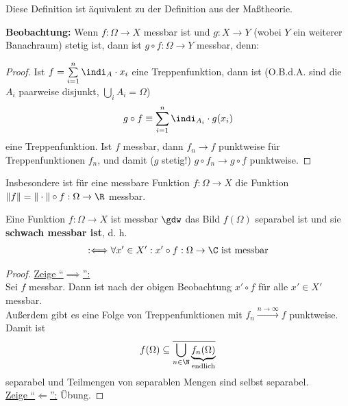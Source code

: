 \begin{bemerkung}
Diese Definition ist äquivalent zu der Definition aus der Maßtheorie.
\end{bemerkung}

\textbf{Beobachtung:} Wenn $f:\Omega\to X$ messbar ist und $g:X\to Y$ (wobei $Y$ ein weiterer Banachraum) stetig ist, dann ist $g\circ f:\Omega\to Y$ messbar, denn:

\begin{proof}
Ist $f=\sum\limits_{i=1}^n\indi_A\cdot x_i$ eine Treppenfunktion, dann ist (O.B.d.A. sind die $A_i$ paarweise disjunkt, $\bigcup\limits_i A_i=\Omega$)
\begin{align*}
g\circ f\equiv\sum\limits_{i=1}^n\indi_{A_i}\cdot g(x_i)
\end{align*}
eine Treppenfunktion. Ist $f$ messbar, dann $f_n\longrightarrow f$ punktweise für Treppenfunktionen $f_n$, und damit ($g$ stetig!) $g\circ f_n\to g\circ f$ punktweise.
\end{proof}

Insbesondere ist für eine messbare Funktion $f:\Omega\to X$ die Funktion\\ $\Vert f\Vert=\Vert\cdot\Vert\circ f:\Omega\to\R$ messbar.

\begin{theorem}[Pettis]\label{theoremPettis}\enter
Eine Funktion $f:\Omega\to X$ ist messbar $\gdw$ das Bild $f(\Omega)$ separabel ist und sie \textbf{schwach messbar ist}, d. h.
\begin{align*}
:\Longleftrightarrow\forall x'\in X':x'\circ f:\Omega\to\C\text{ ist messbar}
\end{align*}
\end{theorem}
\begin{proof}
\underline{Zeige ``$\implies$'':}\\
Sei $f$ messbar. Dann ist nach der obigen Beobachtung $x'\circ f$ für alle $x'\in X'$ messbar.\\
Außerdem gibt es eine Folge von Treppenfunktionen mit $f_n\stackrel{n\to\infty}{\longrightarrow} f$ punktweise. Damit ist
\begin{align*}
f(\Omega)\subseteq\overline{\bigcup\limits_{n\in\N}\underbrace{ f_n(\Omega)}_{\text{endlich}}}
\end{align*}
separabel und Teilmengen von separablen Mengen sind selbst separabel.\\

\underline{Zeige ``$\Longleftarrow$'':} Übung.
\end{proof}

